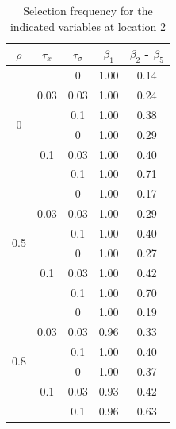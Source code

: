 \documentclass[authoryear, review, 11pt]{elsarticle}
\begin{document}
		\begin{table}[ht]
		\begin{center}
		\begin{tabular}{ccc|cc}
		$\rho$ & $\tau_x$ & $\tau_\sigma$ &  $\beta_1$ & $\beta_2$ - $\beta_5$ \\ 
		  \hline
		\multirow{6}{*}{0} & \multirow{3}{*}{0.03} & 0 & 1.00 & 0.14 \\ 
		 &  & 0.03 &   1.00 & 0.24 \\ 
		 &  & 0.1 &   1.00 & 0.38 \\ \cline{2-5}
		 & \multirow{3}{*}{0.1} & 0 &   1.00 & 0.29 \\ 
		 &  & 0.03 &   1.00 & 0.40 \\ 
		 &  & 0.1 &   1.00 & 0.71 \\ \cline{1-5}
		\multirow{6}{*}{0.5} & \multirow{3}{*}{0.03} & 0 &   1.00 & 0.17 \\ 
		 &  & 0.03 &   1.00 & 0.29 \\ 
		 &  & 0.1 &   1.00 & 0.40 \\ \cline{2-5}
		 & \multirow{3}{*}{0.1} & 0 &   1.00 & 0.27 \\ 
		 &  & 0.03 &   1.00 & 0.42 \\ 
		 &  & 0.1 &   1.00 & 0.70 \\ \cline{1-5}
		\multirow{6}{*}{0.8} & \multirow{3}{*}{0.03} & 0 &   1.00 & 0.19 \\ 
		 &  & 0.03 &   0.96 & 0.33 \\ 
		 &  & 0.1 &   1.00 & 0.40 \\ \cline{2-5}
		 & \multirow{3}{*}{0.1} & 0 &   1.00 & 0.37 \\ 
		 &  & 0.03 &   0.93 & 0.42 \\ 
		 &  & 0.1 &   0.96 & 0.63 \\ 
		  \end{tabular}
		\caption{Selection frequency for the indicated variables at location 2\label{table:loc2-selection}}
		\end{center}
		\end{table}
		
\end{document}
